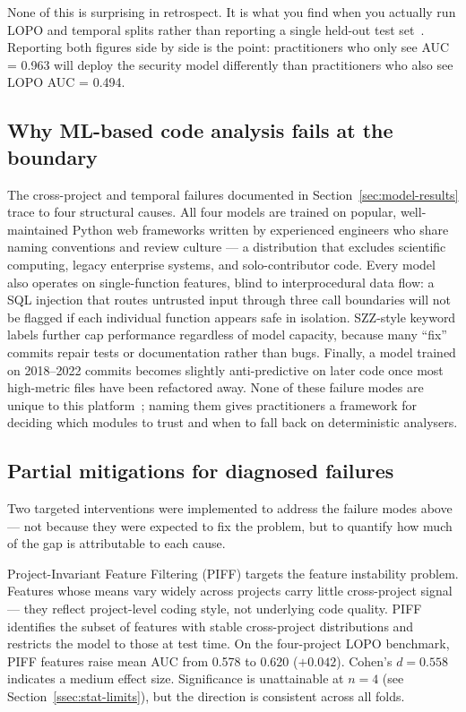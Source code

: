 \documentclass[12pt, oneside]{report}
\begin{document}
None of this is surprising in retrospect. It is what you find when you actually run LOPO and temporal splits rather than reporting a single held-out test set~\cite{lessmann2008}. Reporting both figures side by side is the point: practitioners who only see AUC = 0.963 will deploy the security model differently than practitioners who also see LOPO AUC = 0.494.

\subsection{Why ML-based code analysis fails at the boundary}
\label{ssec:why-ml-fails}

The cross-project and temporal failures documented in Section~\ref{sec:model-results} trace to four structural causes. All four models are trained on popular, well-maintained Python web frameworks written by experienced engineers who share naming conventions and review culture — a distribution that excludes scientific computing, legacy enterprise systems, and solo-contributor code. Every model also operates on single-function features, blind to interprocedural data flow: a SQL injection that routes untrusted input through three call boundaries will not be flagged if each individual function appears safe in isolation. SZZ-style keyword labels further cap performance regardless of model capacity, because many ``fix'' commits repair tests or documentation rather than bugs. Finally, a model trained on 2018--2022 commits becomes slightly anti-predictive on later code once most high-metric files have been refactored away. None of these failure modes are unique to this platform~\cite{lessmann2008, kamei2013}; naming them gives practitioners a framework for deciding which modules to trust and when to fall back on deterministic analysers.

\subsection{Partial mitigations for diagnosed failures}
\label{ssec:mitigations}

Two targeted interventions were implemented to address the failure modes above — not because they were expected to fix the problem, but to quantify how much of the gap is attributable to each cause.

Project-Invariant Feature Filtering (PIFF) targets the feature instability problem. Features whose means vary widely across projects carry little cross-project signal — they reflect project-level coding style, not underlying code quality. PIFF identifies the subset of features with stable cross-project distributions and restricts the model to those at test time. On the four-project LOPO benchmark, PIFF features raise mean AUC from 0.578 to 0.620 ($+0.042$). Cohen's $d = 0.558$ indicates a medium effect size. Significance is unattainable at $n = 4$ (see Section~\ref{ssec:stat-limits}), but the direction is consistent across all folds.
\end{document}
